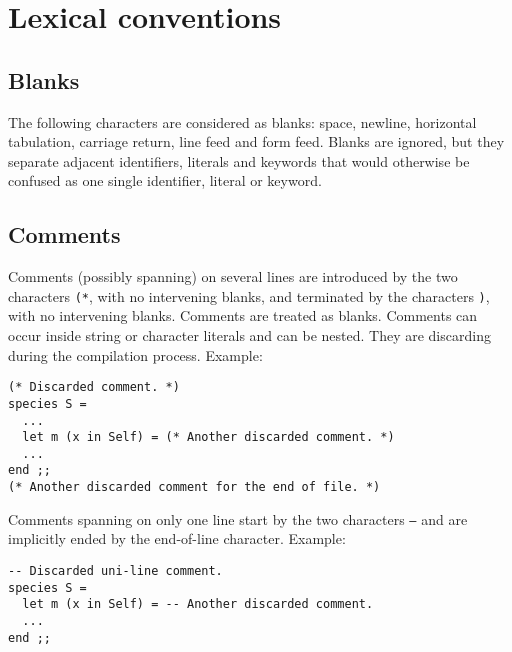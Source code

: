 


\section{Lexical conventions}



\subsection{Blanks}
The following characters are considered as blanks: space, newline,
horizontal tabulation, carriage return, line feed and form
feed. Blanks are ignored, but they separate adjacent identifiers,
literals and keywords that would otherwise be confused as one single
identifier, literal or keyword.



\subsection{Comments}
Comments (possibly spanning) on several lines are introduced by the
two characters {\tt (*}, with no intervening blanks, and terminated by
the characters {\tt *)}, with no intervening blanks. Comments are
treated as blanks. Comments can occur inside string or character
literals and can be nested. They are discarding during the compilation
process. Example:
{\scriptsize
\begin{lstlisting}
(* Discarded comment. *)
species S =
  ...
  let m (x in Self) = (* Another discarded comment. *)
  ...
end ;;
(* Another discarded comment for the end of file. *)
\end{lstlisting}
}


Comments spanning on only one line start by the two characters
{\tt --} and are implicitly ended by the end-of-line character.
Example:
{\scriptsize
\begin{lstlisting}
-- Discarded uni-line comment.
species S =
  let m (x in Self) = -- Another discarded comment.
  ...
end ;;
\end{lstlisting}
}



